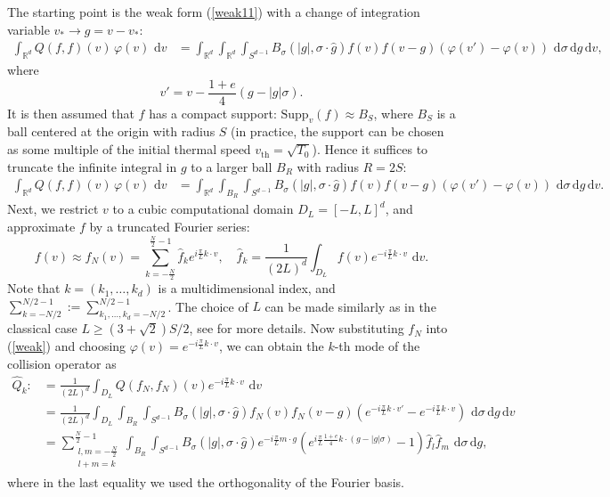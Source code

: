 \documentclass[review, times]{elsarticle}
\newcommand{\rd}{\,\mathrm{d}}
\begin{document}
The starting point is the weak form (\ref{weak11}) with a change of integration variable $v_* \rightarrow g=v-v_*$:
\begin{align} 
\int_{\mathbb{R}^d} Q(f,f)(v)\,\varphi(v)\,\rd{v}&= \int_{\mathbb{R}^d} \int_{\mathbb{R}^d} \int_{S^{d-1}} B_{\sigma}(|g|,\sigma\cdot \hat{g})f(v)f(v-g)  \left(\varphi(v')-\varphi(v)\right)\,\rd{\sigma} \rd{g} \rd{v},
\end{align}
where
\begin{equation}
v'=v-\frac{1+e}{4}(g-|g|\sigma).
\end{equation}
It is then assumed that $f$ has a compact support: $\text{Supp}_v(f) \approx B_S$, where $B_S$ is a ball centered at the origin with radius $S$ (in practice, the support can be chosen as some multiple of the initial thermal speed $v_{\text{th}}=\sqrt{T_0}$). Hence it suffices to truncate the infinite integral in $g$ to a larger ball $B_R$ with radius $R=2S$:
\begin{align}  \label{weak}
\int_{\mathbb{R}^d} Q(f,f)(v)\,\varphi(v)\,\rd{v}&= \int_{\mathbb{R}^d} \int_{B_R} \int_{S^{d-1}} B_{\sigma}(|g|,\sigma\cdot \hat{g})f(v)f(v-g)  \left(\varphi(v')-\varphi(v)\right)\,\rd{\sigma} \rd{g} \rd{v}.
\end{align}
Next, we restrict $v$ to a cubic computational domain $D_L=[-L,L]^d$, and approximate $f$ by a truncated Fourier series:
\begin{equation}
f(v)\approx f_N(v)=\sum_{k=-\frac{N}{2}}^{\frac{N}{2}-1}\hat{f}_k e^{i\frac{\pi}{L}k\cdot v}, \quad \hat{f}_k=\frac{1}{(2L)^d}\int_{D_L}f(v)e^{-i\frac{\pi}{L}k\cdot v}\,\rd{v}.
\end{equation}
Note that $k=(k_1,\dots,k_d)$ is a multidimensional index, and $\sum_{k=-N/2}^{N/2-1}:=\sum_{k_1,\dots,k_d=-N/2}^{N/2-1}$. The choice of $L$ can be made similarly as in the classical case $L\geq (3+\sqrt{2})S/2$, see \cite{PR00} for more details. Now substituting $f_N$ into (\ref{weak}) and choosing $\varphi(v)=e^{-i\frac{\pi}{L}k\cdot v}$, we can obtain the $k$-th mode of the collision operator as
\begin{align} \label{QQ}
\hat{Q}_k:&=\frac{1}{(2L)^d}\int_{D_L}Q(f_N,f_N)(v)e^{-i\frac{\pi}{L}k\cdot v}\,\rd{v}\nonumber\\
&=\frac{1}{(2L)^d}\int_{D_L} \int_{B_R} \int_{S^{d-1}} B_{\sigma}(|g|,\sigma\cdot \hat{g})f_N(v)f_N(v-g)  \left(e^{-i\frac{\pi}{L}k\cdot v'}-e^{-i\frac{\pi}{L}k\cdot v}\right)\,\rd{\sigma} \rd{g} \rd{v}\nonumber\\
&=\sum_{\substack{l,m=-\frac{N}{2}\\l+m=k}}^{\frac{N}{2}-1}\int_{B_R}\int_{S^{d-1}}B_{\sigma}(|g|,\sigma\cdot \hat{g})e^{-i\frac{\pi}{L}m\cdot g}\left(e^{i\frac{\pi}{L}\frac{1+e}{4}k\cdot (g-|g|\sigma)}-1\right)\hat{f}_l\hat{f}_m\,\rd{\sigma} \rd{g},
\end{align}
where in the last equality we used the orthogonality of the Fourier basis.
\end{document}
